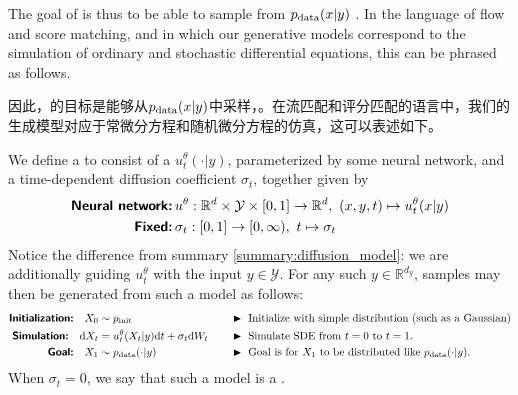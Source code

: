 The goal of  is thus to be able to sample from $p_{\rm{data}}(x|y)$ . In the language of flow and score matching, and in which our generative models correspond to the simulation of ordinary and stochastic differential equations, this can be phrased as follows.

因此，的目标是能够从$p_{\rm{data}}(x|y)$中采样，。在流匹配和评分匹配的语言中，我们的生成模型对应于常微分方程和随机微分方程的仿真，这可以表述如下。

\begin{ideabox}
We define a  to consist of a  $u_t^{\theta}(\cdot | y)$, parameterized by some neural network, and a time-dependent diffusion coefficient $\sigma_t$, together given by
\begin{align*}
    \textbf{\sffamily Neural network:}&\, u^\theta: \mathbb{R}^d \times \mathcal{Y} \times [0,1] \to \mathbb{R}^d,\,\, (x,y,t) \mapsto u_t^{\theta}(x|y)\\
    \textbf{\sffamily Fixed:}&\, \sigma_t: [0,1] \to [0,\infty),\,\, t \mapsto \sigma_t
\end{align*}
Notice the difference from summary \ref{summary:diffusion_model}: we are additionally guiding $u_t^\theta$ with the input $y\in \mathcal{Y}$. For any such $y \in \mathbb{R}^{d_y}$, samples may then be generated from such a model as follows:
\begin{align*}
    \textbf{\sffamily Initialization:}\quad X_0&\sim\pinit \quad  &&\blacktriangleright\,\,\text{Initialize with simple distribution (such as a Gaussian)}\\
    \textbf{\sffamily Simulation:}\quad \dd X_t &= u_t^\theta(X_t|y)\dd t + \sigma_t\dd W_t\quad &&\blacktriangleright\,\,\text{Simulate SDE from $t=0$ to $t=1$.}\\
    \textbf{\sffamily Goal:}\quad X_1 &\sim  \pdata(\cdot | y) \quad &&\blacktriangleright\,\,\text{Goal is for $X_1$ to be distributed like $\pdata(\cdot|y)$.}
\end{align*}
When $\sigma_t = 0$, we say that such a model is a .
\end{ideabox}

